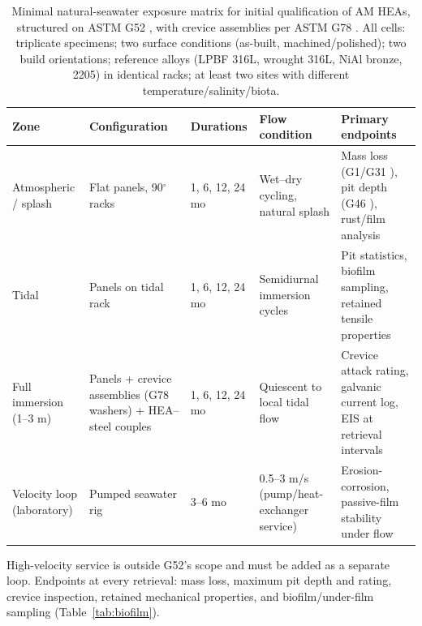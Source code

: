 \begin{table}[t]
\centering
\caption{Minimal natural-seawater exposure matrix for initial qualification of AM HEAs, structured on ASTM G52 \cite{astm_g52}, with crevice assemblies per ASTM G78 \cite{astm_g78}. All cells: triplicate specimens; two surface conditions (as-built, machined/polished); two build orientations; reference alloys (LPBF 316L, wrought 316L, NiAl bronze, 2205) in identical racks; at least two sites with different temperature/salinity/biota.}
\label{tab:exposure}
\footnotesize
\begin{tabularx}{\textwidth}{@{}lllXX@{}}
\toprule
Zone & Configuration & Durations & Flow condition & Primary endpoints \\
\midrule
Atmospheric / splash & Flat panels, 90$^{\circ}$ racks \cite{astm_g52} & 1, 6, 12, 24 mo & Wet--dry cycling, natural splash & Mass loss (G1/G31 \cite{astm_g1,astm_g31}), pit depth (G46 \cite{astm_g46}), rust/film analysis \\
Tidal & Panels on tidal rack \cite{astm_g52} & 1, 6, 12, 24 mo & Semidiurnal immersion cycles & Pit statistics, biofilm sampling, retained tensile properties \\
Full immersion (1--3 m) & Panels + crevice assemblies (G78 washers) + HEA--steel couples \cite{astm_g78,astm_g71} & 1, 6, 12, 24 mo & Quiescent to local tidal flow & Crevice attack rating, galvanic current log, EIS at retrieval intervals \\
Velocity loop (laboratory) & Pumped seawater rig & 3--6 mo & 0.5--3 m/s (pump/heat-exchanger service) & Erosion-corrosion, passive-film stability under flow \\
\bottomrule
\end{tabularx}

\vspace{4pt}
\footnotesize High-velocity service is outside G52's scope and must be added as a separate loop. Endpoints at every retrieval: mass loss, maximum pit depth and rating, crevice inspection, retained mechanical properties, and biofilm/under-film sampling (Table~\ref{tab:biofilm}).

\end{table}
